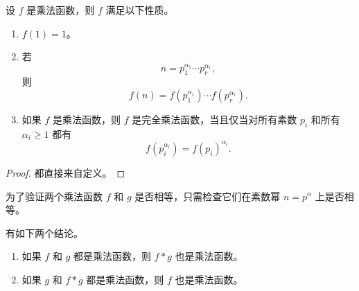 \begin{theorem}
	设 $f$ 是乘法函数，则 $f$ 满足以下性质。
	\begin{enumerate}[label=(\alph*)]
		\item $f(1)=1$。
		\item 若
		\[
			n=p_1^{\alpha_1}\cdots p_r^{\alpha_r},
		\]
		则
		\[
			f(n)=f(p_1^{\alpha_1})\cdots f(p_r^{\alpha_r}).
		\]
		\item 如果 $f$ 是乘法函数，则 $f$ 是完全乘法函数，当且仅当对所有素数 $p_i$ 和所有 $\alpha_i\geq 1$ 都有
		\[
			f(p_i^{\alpha_i})=f(p_i)^{\alpha_i}.
		\]
	\end{enumerate}
\end{theorem}

\begin{proof}
	都直接来自定义。
\end{proof}

\begin{remark}
	为了验证两个乘法函数 $f$ 和 $g$ 是否相等，只需检查它们在素数幂 $n=p^\alpha$ 上是否相等。
\end{remark}

\begin{theorem}
	有如下两个结论。
	\begin{enumerate}[label=(\alph*)]
		\item 如果 $f$ 和 $g$ 都是乘法函数，则 $f*g$ 也是乘法函数。
		\item 如果 $g$ 和 $f*g$ 都是乘法函数，则 $f$ 也是乘法函数。
	\end{enumerate}
\end{theorem}

